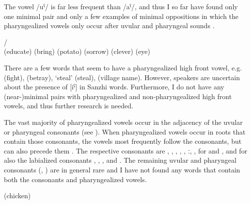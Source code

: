 The vowel /uˁ/ is far less frequent than /aˁ/, and thus I so far have found only one minimal pair and only a few examples of minimal oppositions in which the pharyngealized vowels only occur after uvular and pharyngeal sounds .
%
\begin{exe}
	\ex	\label{ex:pharyngealization minimal pairs B phon@A}
	\begin{xlist}
	\TabPositions{15em}
		\ex	{} /   \tab {} \\
		(educate) \tab (bring)
		\ex	{}  (potato) \tab {}  (sorrow)
		\ex	{} 		\tab {}  (clever)
		\ex	{} 		\tab {}  (eye)
	\end{xlist}
\end{exe}

There are a few words that seem to have a pharyngealized high front vowel, e.g.   (fight),   (betray),  `steal' (steal),  (village name). However, speakers are uncertain about the presence of [iˁ] in Sanzhi words. Furthermore, I do not have any (near-)minimal pairs with pharyngealized and non-pharyngealized high front vowels, and thus further research is needed.

The vast majority of pharyngealized vowels occur in the adjacency of the uvular or pharyngeal consonants (see ). When pharyngealized vowels occur in roots that contain those consonants, the vowels most frequently follow the consonants, but can also precede them . The respective consonants are , , , , , ː, ,  for  and , and for  also the labialized consonants , , , and . The remaining uvular and pharyngeal consonants (, ) are in general rare and I have not found any words that contain both the consonants and pharyngealized vowels.
%
\begin{exe}
	\ex	\label{ex:uvular pharyngealphon1}
\TabPositions{15em}
  (chicken)	\tab {} 	\\
 	\tab {} 	\\
 	\tab {} 	\\
 	
\end{exe}

